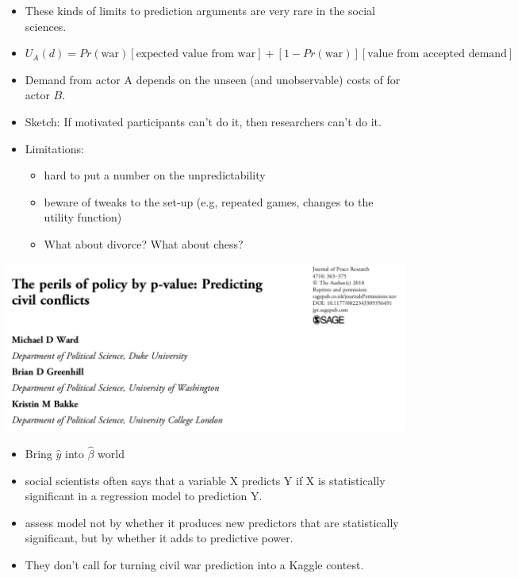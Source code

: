 \documentclass[aspectratio=169]{beamer}
\begin{document}
\begin{frame}

\begin{itemize}
\item These kinds of limits to prediction arguments are very rare in the social sciences.
\pause
\item $U_A(d) = Pr(\text{war})[\text{expected value from war}] + [1 - Pr(\text{war})][\text{value from accepted demand}]$
\pause
\item Demand from actor A depends on the unseen (and unobservable) costs of for actor $B$.
\pause
\item Sketch: If motivated participants can't do it, then researchers can't do it. 
\pause
\item Limitations:
  \begin{itemize}
  \item hard to put a number on the unpredictability
  \pause
  \item beware of tweaks to the set-up (e.g, repeated games, changes to the utility function)
  \pause
  \item What about divorce? \pause What about chess?
\end{itemize}
\end{itemize}

\end{frame}
\begin{frame}

\begin{center}
\includegraphics[height=0.7\textheight]{figures/ward_perils_2010_title}
\end{center}

\end{frame}
\begin{frame}

\begin{itemize}
\item Bring $\hat{y}$ into $\hat{\beta}$ world
\pause
\item social scientists often says that a variable X predicts Y if X is statistically significant in a regression model to prediction Y.
\pause
\item assess model not by whether it produces new predictors that are statistically significant, but by whether it adds to predictive power.
\pause
\item They don't call for turning civil war prediction into a Kaggle contest.
\end{itemize}

\end{frame}
\end{document}
